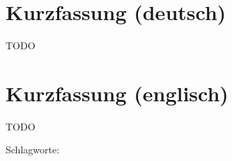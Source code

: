 \chapter*{Kurzfassung (deutsch)}
\thispagestyle{empty}

TODO

\chapter*{Kurzfassung (englisch)}
\thispagestyle{empty}

TODO

\bigskip

\noindent
Schlagworte: 

